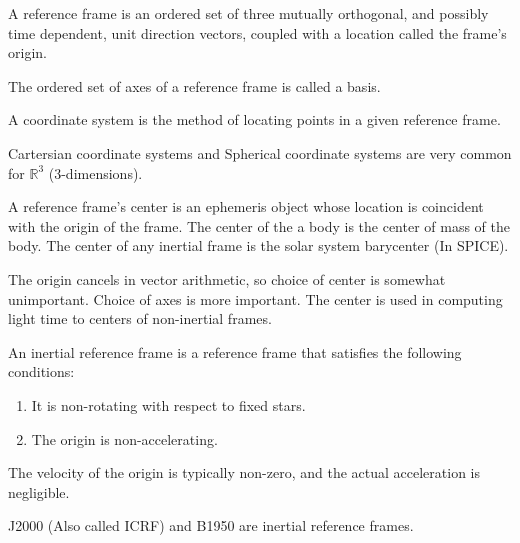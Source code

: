 \documentclass[crop=false,class=book]{standalone}
\begin{document}
            \begin{definition}
            A reference frame is an ordered set of three mutually orthogonal, and possibly time dependent, unit direction vectors, coupled with a location called the frame's origin.
            \end{definition}
            \begin{definition}
            The ordered set of axes of a reference frame is called a basis.
            \end{definition}
            \begin{definition}
            A coordinate system is the method of locating points in a given reference frame.
            \end{definition}
            \begin{example}
            Cartersian coordinate systems and Spherical coordinate systems are very common for $\mathbb{R}^3$ (3-dimensions).
            \end{example}
            \begin{remark}
            A reference frame's center is an ephemeris object whose location is coincident with the origin of the frame. The center of the a body is the center of mass of the body. The center of any inertial frame is the solar system barycenter (In SPICE).
            \end{remark}
            The origin cancels in vector arithmetic, so choice of center is somewhat unimportant. Choice of axes is more important. The center is used in computing light time to centers of non-inertial frames.
            \begin{definition}
            An inertial reference frame is a reference frame that satisfies the following conditions:
            \begin{enumerate}
                \item It is non-rotating with respect to fixed stars.
                \item The origin is non-accelerating.
            \end{enumerate}
            \end{definition}
            \begin{remark}
            The velocity of the origin is typically non-zero, and the actual acceleration is negligible.
            \end{remark}
            \begin{example}
            J2000 (Also called ICRF) and B1950 are inertial reference frames.
            \end{example}
\end{document}
